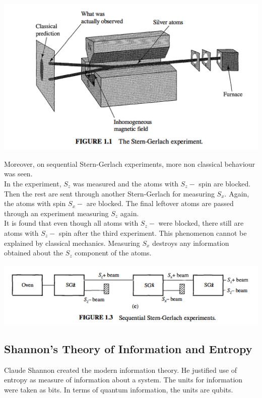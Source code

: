 \documentclass{article}
\begin{document}
            \includegraphics[width = 12 cm]{sterngerlach.png}

            Moreover, on sequential Stern-Gerlach experiments, more non classical behaviour was seen.\\

            In the experiment, $S_z$ was measured and the atoms with $S_z-$ spin are blocked. Then the rest are
            sent through another Stern-Gerlach for measuring $S_x$. Again, the atoms with spin $S_x-$ are blocked.
            The final leftover atoms are passed through an experiment measuring $S_z$ again. \\

            It is found that even though all atoms with $S_z-$ were blocked, there still are atoms with $S_z-$ spin
            after the third experiment. This phenomenon cannot be explained by classical mechanics. Measuring $S_x$ destroys any information obtained about the $S_z$ component of the atoms.

            \includegraphics[width = 12 cm]{seqSG.png}
            
        \subsection{Shannon's Theory of Information and Entropy}
            Claude Shannon created the modern information theory. He justified use of entropy as measure of information
            about a system. The units for information were taken as bits. In terms of quantum information, the units are 
            qubits. \\
\end{document}
